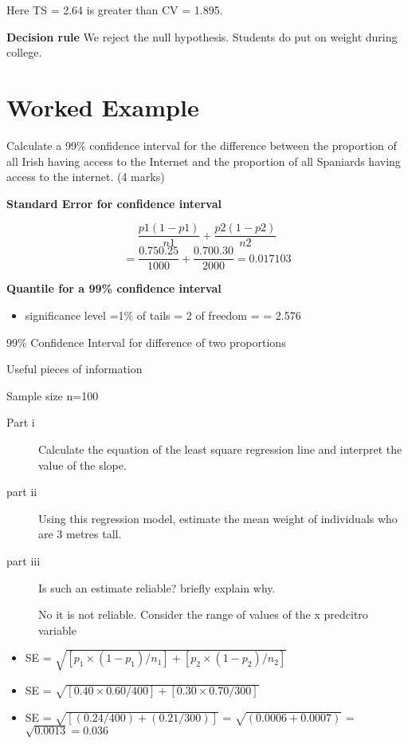 ﻿\documentclass[]{report}
\begin{document}
Here TS = 2.64  is greater than CV = 1.895.

\noindent \textbf{Decision rule}
We reject the null hypothesis. Students do put on weight during college. 




\section{Worked Example}
Calculate a 99\% confidence interval for the difference between the proportion of all Irish having access to the
Internet and the proportion of all Spaniards having access to the internet.  (4 marks)



\noindent \textbf{Standard Error for confidence interval}

\[\frac{p1(1 -p1)}{n1}+ \frac{p2(1 -p2)}{n2}\]
\[=\frac{0.750.25}{1000}+ \frac{0.700.30}{2000}     =  0.017103\]

\noindent \textbf{Quantile for a 99\% confidence interval}
\begin{itemize}
\item significance level  =1\%
\itemnumber of tails = 2
\itemdegrees of freedom = 
\itemquantile = 2.576 
\end{itemize}



99\% Confidence Interval for difference of two proportions



Useful pieces of information


Sample size  n=100


\begin{description}
\item[Part i]
Calculate the equation of the least square regression line and interpret the value of the slope.

\item[part ii]

Using this regression model, estimate the mean weight of individuals who are 3 metres tall.
\item[part iii]

Is such an estimate reliable?  briefly explain why.

No it is not reliable. Consider the range of values of the x predcitro variable
\end{description}



\begin{itemize}
\item SE = $\sqrt{ [p_1 \times (1 - p_1) / n_1] + [p_2 \times (1 - p_2) / n_2] } $
\item SE = $\sqrt{ [0.40 \times 0.60 / 400] + [0.30 \times 0.70 / 300] } $
\item SE  = $\sqrt{[ (0.24 / 400) + (0.21 / 300) ]}$ = $\sqrt{(0.0006 + 0.0007)}$ = $\sqrt{0.0013} = 0.036$
\end{itemize}
\end{document}
